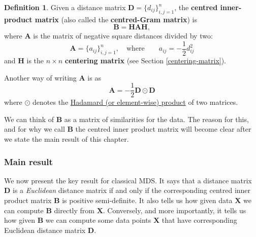 \documentclass[
]{book}
\theoremstyle{definition}
\newtheorem{definition}{Definition}[chapter]
\theoremstyle{definition}
\theoremstyle{definition}
\theoremstyle{definition}
\theoremstyle{remark}
\begin{document}
\begin{definition}
\protect\hypertarget{def:unnamed-chunk-3}{}\label{def:unnamed-chunk-3}Given a distance matrix \({\mathbf D}=\{d_{ij}\}_{i,j=1}^n\),
the \textbf{centred inner-product matrix} (also called the \textbf{centred-Gram matrix}) is
\begin{equation}
{\mathbf B}={\mathbf H} \mathbf A{\mathbf H},
\label{eq:defB}
\end{equation}
where
\(\mathbf A\) is the matrix of negative square distances divided by two:
\begin{equation}
\mathbf A=\{a_{ij}\}_{i,j=1}^n,  \quad \text{where} \qquad a_{ij}=-\frac{1}{2}d_{ij}^2
\label{eq:defA}
\end{equation}
and \(\mathbf H\) is the \(n \times n\) \textbf{centering matrix} (see Section \ref{centering-matrix}).

Another way of writing \(\mathbf A\) is as
\[\mathbf A= -\frac{1}{2}\mathbf D\odot \mathbf D\]
where \(\odot\) denotes the \href{https://en.wikipedia.org/wiki/Hadamard_product_(matrices)}{Hadamard (or element-wise) product} of two matrices.
\end{definition}

We can think of \(\mathbf B\) as a matrix of similarities for the data.
The reason for this, and for why we call \(\mathbf B\) the centred inner product matrix will become clear after we state the main result of this chapter.

\subsubsection*{Main result}\label{main-result-1}

We now present the key result for classical MDS. It says that a distance matrix \(\mathbf D\) is a \emph{Euclidean} distance matrix if and only if the corresponding centred inner product matrix \(\mathbf B\) is positive semi-definite. It also tells us how given data \(\mathbf X\) we can compute \(\mathbf B\) directly from \(\mathbf X\). Conversely, and more importantly, it tells us how given \(\mathbf B\) we can compute some data points \(\mathbf X\) that have corresponding Euclidean distance matrix \(\mathbf D\).
\end{document}
